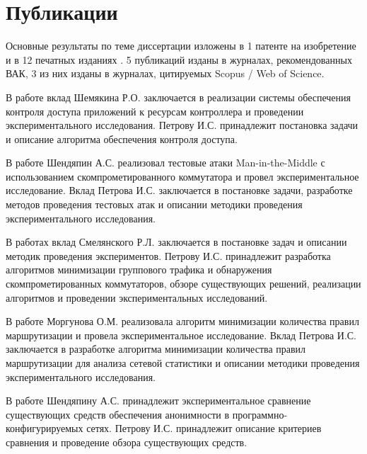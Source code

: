 \documentclass[../thesis.tex]{subfiles}
\begin{document}
\section*{Публикации}

Основные результаты по теме диссертации изложены в 1 патенте на изобретение \cite{petrov2018patent} и в 12 печатных изданиях \cite{petrov2017problem, petrov2017detection, petrov2017control, petrov2017maninthemiddle, petrov2018detection, petrov2018minimizationrus, petrov2018minimization, petrov2018mathematical, petrov2018forwarding, petrov2018anonymity, petrov2019survey, petrov2019forwardingrus}.
5 публикаций \cite{petrov2018minimization, petrov2018mathematical, petrov2018forwarding, petrov2019survey, petrov2019forwardingrus} изданы в журналах, рекомендованных ВАК, 3 из них \cite{petrov2018minimization, petrov2018mathematical, petrov2018forwarding} изданы в журналах, цитируемых Scopus / Web of Science.

В работе \cite{petrov2017control} вклад Шемякина Р.О. заключается в реализации системы обеспечения контроля доступа приложений к ресурсам контроллера и проведении экспериментального исследования.
Петрову И.С. принадлежит постановка задачи и описание алгоритма обеспечения контроля доступа.

В работе \cite{petrov2017maninthemiddle} Шендяпин А.С. реализовал тестовые атаки Man-in-the-Middle с использованием скомпрометированного коммутатора и провел экспериментальное исследование.
Вклад Петрова И.С. заключается в постановке задачи, разработке методов проведения тестовых атак и описании методики проведения экспериментального исследования.

В работах \cite{petrov2018detection, petrov2018minimizationrus, petrov2018minimization} вклад Смелянского Р.Л. заключается в постановке задач и описании методик проведения экспериментов.
Петрову И.С. принадлежит разработка алгоритмов минимизации группового трафика и обнаружения скомпрометированных коммутаторов, обзоре существующих решений, реализации алгоритмов и проведении экспериментальных исследований.

В работе \cite{petrov2018forwarding} Моргунова О.М. реализовала алгоритм минимизации количества правил маршрутизации и провела экспериментальное исследование.
Вклад Петрова И.С. заключается в разработке алгоритма минимизации количества правил маршрутизации для анализа сетевой статистики и описании методики проведения экспериментального исследования.

В работе \cite{petrov2018anonymity} Шендяпину А.С. принадлежит экспериментальное сравнение существующих средств обеспечения анонимности в программно-конфигурируемых сетях.
Петрову И.С. принадлежит описание критериев сравнения и проведение обзора существующих средств.
\end{document}
